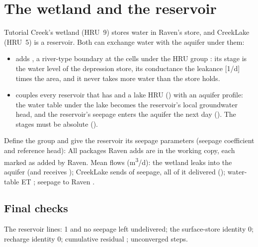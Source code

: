 \section{The wetland and the reservoir}
Tutorial Creek's wetland (HRU~9) stores water in Raven's  store, and CreekLake (HRU~5) is a reservoir.
Both can exchange water with the aquifer under them:
\begin{itemize}
\item {} adds , a river-type boundary at the
      cells under the HRU group : its stage is the water level of the depression store, its conductance
      the leakance [1/d] times the area, and it never takes more water than the store holds.
\item {} couples every reservoir that has  and a lake HRU () with an
      aquifer profile: the water table under the lake becomes the reservoir's local groundwater head, and the reservoir's
      seepage enters the aquifer the next day (). The stages must be absolute ().
\end{itemize}
Define the group and give the reservoir its seepage parameters (seepage coefficient and reference head):
All  packages Raven adds are in the working copy, each marked as added by Raven. Mean flows (m\textsuperscript{3}/d):
the wetland leaks  into the aquifer (and receives ); CreekLake sends 
of seepage, all of it delivered (); water-table ET ; seepage to Raven .

\subsection{Final checks}
\begin{tocheck}
The reservoir lines:  1 and no seepage left undelivered; the surface-store identity 0; recharge
identity 0; cumulative residual ;  unconverged steps.
\end{tocheck}

